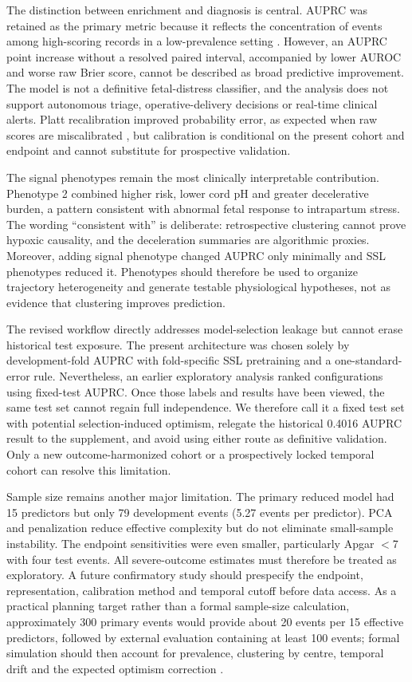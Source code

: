 \documentclass[utf8]{FrontiersinHarvard}
\begin{document}
The distinction between enrichment and diagnosis is central. AUPRC was retained as the primary metric because it reflects the concentration of events among high-scoring records in a low-prevalence setting \citep{davis2006}. However, an AUPRC point increase without a resolved paired interval, accompanied by lower AUROC and worse raw Brier score, cannot be described as broad predictive improvement. The model is not a definitive fetal-distress classifier, and the analysis does not support autonomous triage, operative-delivery decisions or real-time clinical alerts. Platt recalibration improved probability error, as expected when raw scores are miscalibrated \citep{vanCalster2019}, but calibration is conditional on the present cohort and endpoint and cannot substitute for prospective validation.

The signal phenotypes remain the most clinically interpretable contribution. Phenotype 2 combined higher risk, lower cord pH and greater decelerative burden, a pattern consistent with abnormal fetal response to intrapartum stress. The wording ``consistent with'' is deliberate: retrospective clustering cannot prove hypoxic causality, and the deceleration summaries are algorithmic proxies. Moreover, adding signal phenotype changed AUPRC only minimally and SSL phenotypes reduced it. Phenotypes should therefore be used to organize trajectory heterogeneity and generate testable physiological hypotheses, not as evidence that clustering improves prediction.

The revised workflow directly addresses model-selection leakage but cannot erase historical test exposure. The present architecture was chosen solely by development-fold AUPRC with fold-specific SSL pretraining and a one-standard-error rule. Nevertheless, an earlier exploratory analysis ranked configurations using fixed-test AUPRC. Once those labels and results have been viewed, the same test set cannot regain full independence. We therefore call it a fixed test set with potential selection-induced optimism, relegate the historical 0.4016 AUPRC result to the supplement, and avoid using either route as definitive validation. Only a new outcome-harmonized cohort or a prospectively locked temporal cohort can resolve this limitation.

Sample size remains another major limitation. The primary reduced model had 15 predictors but only 79 development events (5.27 events per predictor). PCA and penalization reduce effective complexity but do not eliminate small-sample instability. The endpoint sensitivities were even smaller, particularly Apgar $<$7 with four test events. All severe-outcome estimates must therefore be treated as exploratory. A future confirmatory study should prespecify the endpoint, representation, calibration method and temporal cutoff before data access. As a practical planning target rather than a formal sample-size calculation, approximately 300 primary events would provide about 20 events per 15 effective predictors, followed by external evaluation containing at least 100 events; formal simulation should then account for prevalence, clustering by centre, temporal drift and the expected optimism correction \citep{steyerberg2019,tripodai2024}.
\end{document}
